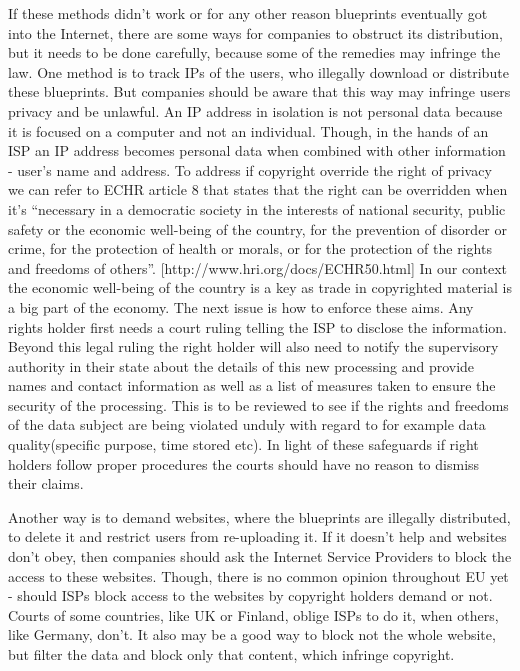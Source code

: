 If these methods didn’t work or for any other reason blueprints eventually got into the Internet, there are some ways for companies to obstruct its distribution, but it needs to be done carefully, because some of the remedies may infringe the law.
One method is to track IPs of the users, who illegally download or distribute these blueprints. But companies should be aware that this way may infringe users privacy and be unlawful. An IP address in isolation is not personal data because it is focused on a computer and not an individual. Though, in the hands of an ISP an IP address becomes personal data when combined with other information - user’s name and address. To address if copyright override the right of privacy we can refer to ECHR article 8 that states that the right can be overridden when it’s “necessary in a democratic society in the interests of national security, public safety or the economic well-being of the country, for the prevention of disorder or crime, for the protection of health or morals, or for the protection of the rights and freedoms of others”. [http://www.hri.org/docs/ECHR50.html] In our context the economic well-being of the country is a key as trade in copyrighted material is a big part of the economy.
The next issue is how to enforce these aims. Any rights holder first needs a court ruling telling the ISP to disclose the information. Beyond this legal ruling the right holder will also need to notify the supervisory authority in their state about the details of this new processing and provide names and contact information as well as a list of measures taken to ensure the security of the processing. This is to be reviewed to see if the rights and freedoms of the data subject are being violated unduly with regard to for example data quality(specific purpose, time stored etc). In light of these safeguards if right holders follow proper procedures the courts should have no reason to dismiss their claims.

Another way is to demand websites, where the blueprints are illegally distributed, to delete it and restrict users from re-uploading it. If it doesn’t help and websites don’t obey, then companies should ask the Internet Service Providers to block the access to these websites. Though, there is no common opinion throughout EU yet - should ISPs block access to the websites by copyright holders demand or not. Courts of some countries, like UK or Finland, oblige ISPs to do it, when others, like Germany, don’t. It also may be a good way to block not the whole website, but filter the data and block only that content, which infringe copyright.

